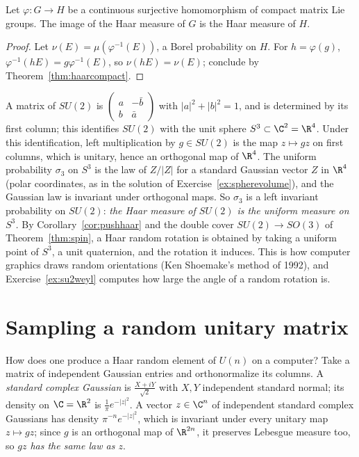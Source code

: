 \begin{corollary}\label{cor:pushhaar}
Let $\varphi\colon G\to H$ be a continuous surjective homomorphism of compact matrix Lie groups. The image of the Haar measure of $G$ is the Haar measure of $H$.
\end{corollary}

\begin{proof}
Let $\nu(E)=\mu(\varphi^{-1}(E))$, a Borel probability on $H$. For $h=\varphi(g)$, $\varphi^{-1}(hE)=g\varphi^{-1}(E)$, so $\nu(hE)=\nu(E)$; conclude by Theorem~\ref{thm:haarcompact}.
\end{proof}

\begin{example}[$SU(2)$ and $SO(3)$]\label{ex:su2haar}
A matrix of $SU(2)$ is $\begin{pmatrix}a&-\bar b\\b&\bar a\end{pmatrix}$ with $|a|^2+|b|^2=1$, and is determined by its first column; this identifies $SU(2)$ with the unit sphere
$S^3\subset\C^2=\R^4$. Under this identification, left multiplication by $g\in SU(2)$ is the map $z\mapsto gz$ on first columns, which is unitary, hence an orthogonal map of $\R^4$.
The uniform probability $\sigma_3$ on $S^3$ is the law of $Z/|Z|$ for a standard Gaussian vector $Z$ in $\R^4$ (polar coordinates, as in the solution of Exercise~\ref{ex:spherevolume}), and
the Gaussian law is invariant under orthogonal maps. So $\sigma_3$ is a left invariant probability on $SU(2)$: \emph{the Haar measure of $SU(2)$ is the uniform measure on $S^3$.}
By Corollary~\ref{cor:pushhaar} and the double cover $SU(2)\to SO(3)$ of Theorem~\ref{thm:spin}, a Haar random rotation is obtained by taking a uniform point of $S^3$, a unit
quaternion, and the rotation it induces. This is how computer graphics draws random orientations (Ken Shoemake's method of 1992), and Exercise~\ref{ex:su2weyl} computes
how large the angle of a random rotation is.
\end{example}

\section{Sampling a random unitary matrix}

How does one produce a Haar random element of $U(n)$ on a computer? Take a matrix of independent Gaussian entries and orthonormalize its columns.
A \emph{standard complex Gaussian} is $\frac{X+iY}{\sqrt2}$ with $X,Y$ independent standard normal; its density on $\C=\R^2$ is $\frac1\pi e^{-|z|^2}$. A vector $z\in\C^n$ of independent
standard complex Gaussians has density $\pi^{-n}e^{-|z|^2}$, which is invariant under every unitary map $z\mapsto gz$; since $g$ is an orthogonal map of $\R^{2n}$, it preserves
Lebesgue measure too, so \emph{$gz$ has the same law as $z$}.

